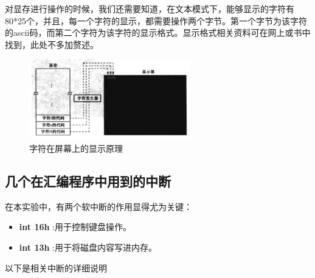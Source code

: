 \documentclass[forprint]{WHUBachelor}
\begin{document}
对显存进行操作的时候，我们还需要知道，在文本模式下，能够显示的字符有80*25个，并且，每一个字符的显示，都需要操作两个字节。第一个字节为该字符的ascii码，而第二个字符为该字符的显示格式。显示格式相关资料可在网上或书中找到，此处不多加赘述。

\begin{figure}[htp]
  \centering
  \includegraphics[width=7cm]{"./figure/display_text_mode.png"}
  \caption{字符在屏幕上的显示原理}
  \label{fig:display_text_mode}
\end{figure}


\subsection{几个在汇编程序中用到的中断}\label{sub:interrupt}

在本实验中，有两个软中断的作用显得尤为关键：

\begin{itemize}
  \item \textbf{int 16h} :用于控制键盘操作。
  \item \textbf{int 13h} :用于将磁盘内容写进内存。
\end{itemize}

以下是相关中断的详细说明
\end{document}
